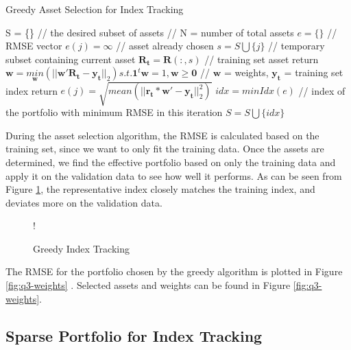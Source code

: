 \documentclass[11pt]{article}
\begin{document}
\begin{algorithm}[H]
\caption{Greedy Asset Selection for Index Tracking}
\label{alg:greedy-index}
\begin{algorithmic}
\State S = \{\} // the desired subset of assets
 // N = number of total assets
\State $e = \{\}$ // RMSE vector
\State $e(j) = \infty$ // asset already chosen
\Else
\State $s = S \bigcup \{j\}$ // temporary subset containing current asset
\State $\bm{R_t} = \bm{R}(:, s)$ // training set asset return
\State $\bm{w} = \underset{\bm{w}}{min}(||\bm{w}'\bm{R_t} - \bm{y_t}||_2) s.t. \bm{1}^t\bm{w} = 1, \bm{w} \geq \bm{0}$ // $\bm{w}$ = weights, $\bm{y_t}$ = training set index return
\State $e(j) = \sqrt{mean(||\bm{r_t} * \bm{w}' - \bm{y_t}||_2^2)}$
\EndIf
\EndFor
\State $idx = minIdx(e)$ // index of the portfolio with minimum RMSE in this iteration
\State $S = S \bigcup \{idx\}$
\EndFor
\end{algorithmic}
\end{algorithm}

During the asset selection algorithm, the RMSE is calculated based on the training set, since we want to only fit the
training data. Once the assets are determined, we find the effective portfolio based on only the training data and 
apply it on the validation data to see how well it performs. As can be seen from Figure \ref{fig:q3-greedy},
the representative index closely matches the training index, and deviates more on the validation data.

\begin{figure}[!h]
	\vspace{-0.5cm}
   \centering 
 	 {!} { }
    \caption{Greedy Index Tracking}
	\label{fig:q3-greedy}
	\vspace{-0.5cm}
\end{figure}

The RMSE for the portfolio chosen by the greedy algorithm is plotted in Figure \ref{fig:q3-weights} . Selected assets and weights can be found in Figure \ref{fig:q3-weights}.

\subsection{Sparse Portfolio for Index Tracking}
\end{document}
